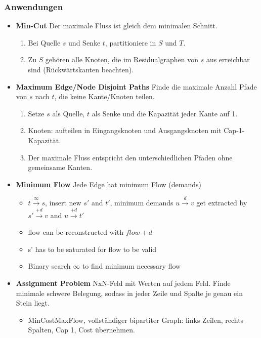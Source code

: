 \subsubsection{Anwendungen}
\begin{itemize}
	\item \textbf{Min-Cut}\newline
	Der maximale Fluss ist gleich dem minimalen Schnitt.
	\begin{enumerate}
		\item Bei Quelle $s$ und Senke $t$, partitioniere in $S$ und $T$.
		\item Zu $S$ gehören alle Knoten, die im Residualgraphen von $s$ aus erreichbar sind (Rückwärtskanten beachten).
	\end{enumerate}

	\item \textbf{Maximum Edge/Node Disjoint Paths}\newline
	Finde die maximale Anzahl Pfade von $s$ nach $t$, die keine Kante/Knoten teilen.
	\begin{enumerate}
		\item Setze $s$ als Quelle, $t$ als Senke und die Kapazität jeder Kante auf 1.
		\item Knoten: aufteilen in Eingangsknoten und Ausgangsknoten mit Cap-1-Kapazität.
		\item Der maximale Fluss entspricht den unterschiedlichen Pfaden ohne gemeinsame Kanten.
	\end{enumerate}

	\item \textbf{Minimum Flow}\newline
	Jede Edge hat minimum Flow (demands)
	\begin{itemize}
		\item $t \overset{\infty}\to s$, insert new $s'$ and $t'$, 
		minimum demands $u \overset{d}\to v$ get extracted by $s' \overset{+d}\to v$ and $u \overset{+d}\to t'$
		\item flow can be reconstructed with $flow + d$
		\item s' has to be saturated for flow to be valid
		\item Binary search $\infty$ to find minimum necessary flow
	\end{itemize}
	

	\item \textbf{Assignment Problem}
	NxN-Feld mit Werten auf jedem Feld. Finde minimale schwere Belegung, sodass in jeder Zeile und Spalte je genau ein Stein liegt.
	\begin{itemize}
		\item MinCostMaxFlow, vollständiger bipartiter Graph: links Zeilen, rechts Spalten, Cap 1, Cost übernehmen.
	\end{itemize}
\end{itemize}

